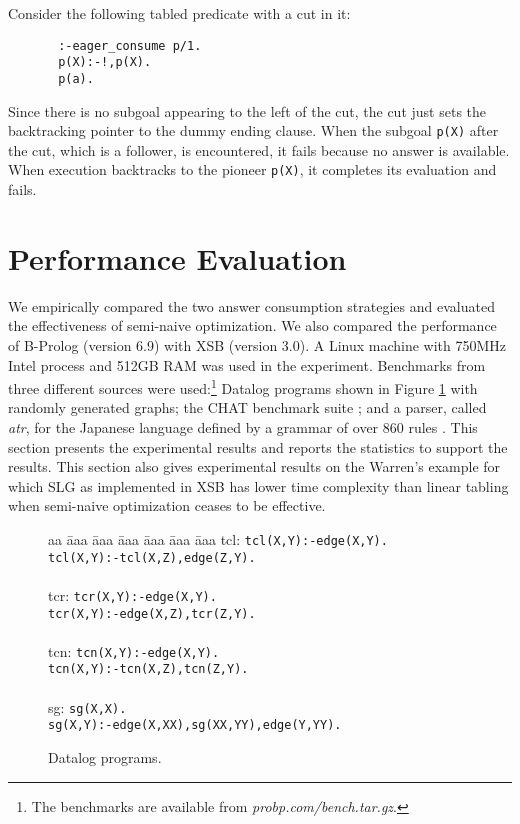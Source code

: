 \documentclass{tlp}
\begin{document}
{Consider the following tabled predicate with a cut in it:
\begin{verbatim}
       :-eager_consume p/1.
       p(X):-!,p(X).
       p(a).
\end{verbatim}
Since there is no subgoal appearing to the left of the cut, the cut just
sets the backtracking pointer to the dummy ending clause. When the subgoal {\tt p(X)} after the cut, which is a follower, is encountered, it fails because no answer is available. When execution backtracks to the pioneer {\tt p(X)}, it completes its evaluation and fails.
}

\section{Performance Evaluation}
We empirically compared the two answer consumption strategies and evaluated the effectiveness of semi-naive optimization. We also compared the performance of B-Prolog (version 6.9) with XSB (version 3.0). A Linux machine with 750MHz Intel process and 512GB RAM was used in the experiment. Benchmarks from three different sources were used:\footnote{The benchmarks are available from {\it probp.com/bench.tar.gz}.} Datalog programs shown in Figure \ref{fig:datalog} with randomly generated graphs; the CHAT benchmark suite \cite{Demoen99}; and a parser, called {\it atr}, for the Japanese language defined by a grammar of over 860 rules \cite{Uratani94}.  This section presents the experimental results and reports the statistics to support the results. This section also gives experimental results on the Warren's example for which SLG as implemented in XSB has lower time complexity than linear tabling when semi-naive optimization ceases to be effective.

\begin{figure}[t]
\begin{center}
\begin{tabbing}
aa \= aaa \= aaa \= aaa \= aaa \= aaa \= aaa \kill
tcl: \> \> {\tt tcl(X,Y):-edge(X,Y).} \\
\> \> {\tt tcl(X,Y):-tcl(X,Z),edge(Z,Y).} \\
\\
tcr: \> \> {\tt tcr(X,Y):-edge(X,Y).} \\
\> \> {\tt tcr(X,Y):-edge(X,Z),tcr(Z,Y).} \\
\\
tcn: \> \> {\tt tcn(X,Y):-edge(X,Y).} \\
\> \> {\tt tcn(X,Y):-tcn(X,Z),tcn(Z,Y).} \\
\\
sg: \> \> {\tt sg(X,X).} \\
\> \> {\tt sg(X,Y):-edge(X,XX),sg(XX,YY),edge(Y,YY).} 
\end{tabbing}
\end{center}
\caption{\label{fig:datalog}Datalog programs.}
\end{figure}
\end{document}

